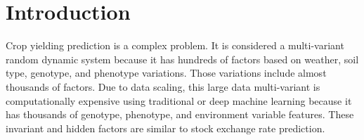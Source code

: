 \section*{Introduction}
Crop yielding prediction is a complex problem. It is considered a multi-variant random dynamic system because it has hundreds of
factors based on weather, soil type, genotype, and phenotype variations. Those variations include almost thousands of factors.
Due to data scaling, this large data multi-variant is computationally expensive using traditional or deep machine learning 
because it has thousands of genotype, phenotype, and environment variable features. These invariant and hidden factors are similar
to stock exchange rate prediction.
